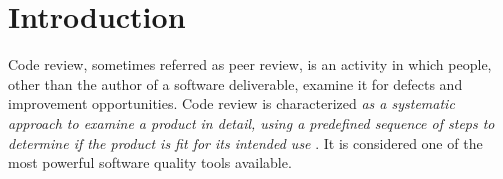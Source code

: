 \documentclass[ifip]{svmult}
\begin{document}
\section{Introduction}
\label{sec:1}

Code review, sometimes referred as peer review, is an activity in which people, other than the author of a software deliverable, 
examine it for defects and improvement opportunities.
Code review is characterized \textit{ as a systematic approach to examine a product in detail, 
using a predefined sequence of steps to determine if the product is fit for its intended use}
\cite{contribution14}. It is considered one of the most powerful software quality tools available. 
\end{document}
